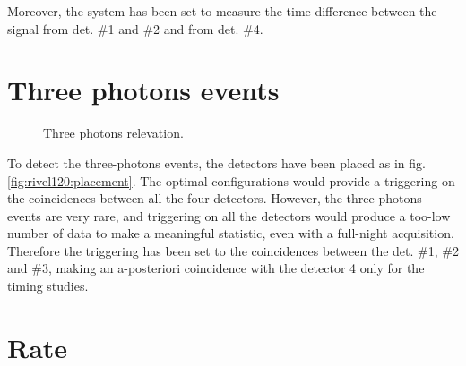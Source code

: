 \documentclass[11pt,a4 paper]{article}
\begin{document}
Moreover, the system has been set to measure the time difference between the signal from det. \#1 and \#2 and from det. \#4. 

\section{Three photons events}

\begin{figure}[H]
    \centering
     \quad
    \caption{Three photons relevation.}
    \label{fig:rivel120}
\end{figure}

To detect the three-photons events, the detectors have been placed as in fig. \ref{fig:rivel120:placement}. The optimal configurations would provide a triggering on the coincidences between all the four detectors. However, the three-photons events are very rare, and triggering on all the detectors would produce a too-low number of data to make a meaningful statistic, even with a full-night acquisition. Therefore the triggering has been set to the coincidences between the det. \#1, \#2 and \#3, making an a-posteriori coincidence with the detector 4 only for the timing studies.

\section{Rate}
\end{document}
